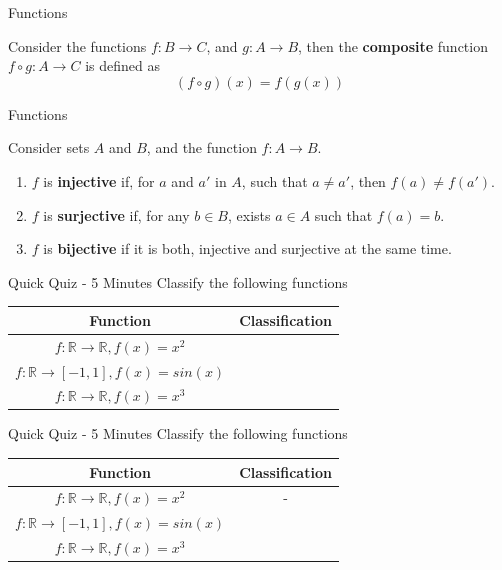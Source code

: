 \documentclass[aspectratio=169]{beamer}
\begin{document}
\begin{frame}{Functions}
    \begin{definition}
        Consider the functions $f:B\rightarrow C$, and $g:A\rightarrow B$, then the \textbf{composite} function $f \circ g:A\rightarrow C$ is defined as
        $$(f\circ g)(x) = f(g(x))$$
    \end{definition}
\end{frame}

\begin{frame}{Functions}
    \begin{definition}
        Consider sets $A$ and $B$, and the function $f:A\rightarrow B$.
        \begin{enumerate}
            \item $f$ is \textbf{injective} if, for $a$ and $a'$ in $A$, such that $a\neq a'$, then $f(a)\neq f(a')$.
            \item $f$ is \textbf{surjective} if, for any $b\in B$, exists $a\in A$ such that $f(a)=b$.
            \item $f$ is \textbf{bijective} if it is both, injective and surjective at the same time.
        \end{enumerate}
    \end{definition}
\end{frame}

\begin{frame}{Quick Quiz - 5 Minutes}
    Classify the following functions
    \begin{center}
        \begin{tabular}{c|c}
            Function & Classification \\
            \hline
            $f:\mathbb{R}\rightarrow\mathbb{R}, f(x) = x^2$ & \\
            $f:\mathbb{R}\rightarrow[-1,1], f(x) = sin(x)$ & \\
            $f:\mathbb{R}\rightarrow\mathbb{R}, f(x) = x^3$ & 
        \end{tabular}
    \end{center}
\end{frame}

\begin{frame}{Quick Quiz - 5 Minutes}
    Classify the following functions
    \begin{center}
        \begin{tabular}{c|c}
            Function & Classification \\
            \hline
            $f:\mathbb{R}\rightarrow\mathbb{R}, f(x) = x^2$ & - \\
            $f:\mathbb{R}\rightarrow[-1,1], f(x) = sin(x)$ & \\
            $f:\mathbb{R}\rightarrow\mathbb{R}, f(x) = x^3$ & 
        \end{tabular}
    \end{center}
\end{frame}
\end{document}
